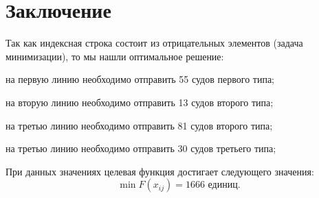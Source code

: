 
\section{\bf Заключение}

Так как индексная строка состоит из отрицательных элементов (задача минимизации), то мы нашли оптимальное решение:

\begin{itemize*}
	\item на первую линию необходимо отправить 55 судов первого типа;
	\item на вторую линию необходимо отправить 13 судов второго типа;
	\item на третью линию необходимо отправить 81 судов второго типа;
	\item на третью линию необходимо отправить 30 судов третьего типа;
\end{itemize*}

При данных значениях целевая функция достигает следующего значения:
$$
	\min F(x_{ij}) = 1666 \text{ единиц.}
$$
